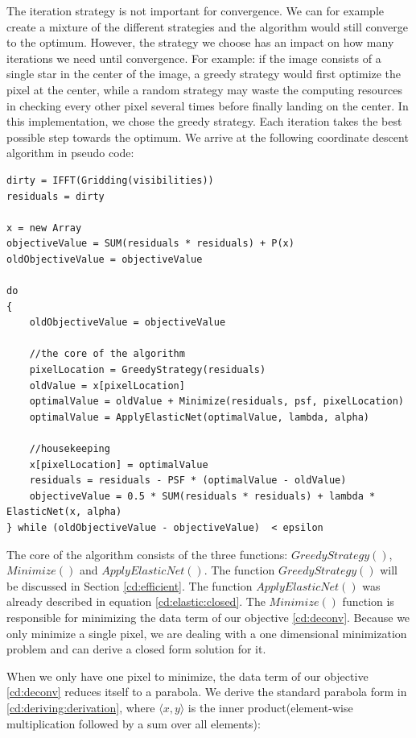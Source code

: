 The iteration strategy is not important for convergence. We can for example create a mixture of the different strategies and the algorithm would still converge to the optimum. However, the strategy we choose has an impact on how many iterations we need until convergence. For example: if the image consists of a single star in the center of the image, a greedy strategy would first optimize the pixel at the center, while a random strategy may waste the computing resources in checking every other pixel several times before finally landing on the center. In this implementation, we chose the greedy strategy. Each iteration takes the best possible step towards the optimum. We arrive at the following coordinate descent algorithm in pseudo code:


\begin{lstlisting}
dirty = IFFT(Gridding(visibilities))
residuals = dirty

x = new Array
objectiveValue = SUM(residuals * residuals) + P(x)
oldObjectiveValue = objectiveValue

do 
{
	oldObjectiveValue = objectiveValue

	//the core of the algorithm
	pixelLocation = GreedyStrategy(residuals)
	oldValue = x[pixelLocation]
	optimalValue = oldValue + Minimize(residuals, psf, pixelLocation)
	optimalValue = ApplyElasticNet(optimalValue, lambda, alpha)
	
	//housekeeping
	x[pixelLocation] = optimalValue
	residuals = residuals - PSF * (optimalValue - oldValue)
	objectiveValue = 0.5 * SUM(residuals * residuals) + lambda * ElasticNet(x, alpha)
} while (oldObjectiveValue - objectiveValue)  < epsilon
\end{lstlisting}

The core of the algorithm consists of the three functions: $GreedyStrategy()$, $Minimize()$ and $ApplyElasticNet()$. The function $GreedyStrategy()$ will be discussed in Section \ref{cd:efficient}. The function $ApplyElasticNet()$ was already described in equation \eqref{cd:elastic:closed}. The $Minimize()$ function is responsible for minimizing the data term of our objective \eqref{cd:deconv}. Because we only minimize a single pixel, we are dealing with a one dimensional minimization problem and can derive a closed form solution for it.

When we only have one pixel to minimize, the data term of our objective \eqref{cd:deconv} reduces itself to a parabola. We derive the standard parabola form in \eqref{cd:deriving:derivation}, where $\langle x, y\rangle$ is the inner product(element-wise multiplication followed by a sum over all elements):

